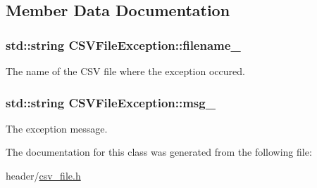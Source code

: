 \subsection{Member Data Documentation}
\hypertarget{classCSVFileException_adcd620025e1390e0fe83486da41b15de}{}
\subsubsection[{filename\+\_\+}]{\setlength{\rightskip}{0pt plus 5cm}std\+::string C\+S\+V\+File\+Exception\+::filename\+\_\+\hspace{0.3cm}{\ttfamily [private]}}\label{classCSVFileException_adcd620025e1390e0fe83486da41b15de}
The name of the C\+S\+V file where the exception occured. \hypertarget{classCSVFileException_ae1b104a3cff93917fd2c9ddac20b63f1}{}
\subsubsection[{msg\+\_\+}]{\setlength{\rightskip}{0pt plus 5cm}std\+::string C\+S\+V\+File\+Exception\+::msg\+\_\+\hspace{0.3cm}{\ttfamily [private]}}\label{classCSVFileException_ae1b104a3cff93917fd2c9ddac20b63f1}
The exception message. 

The documentation for this class was generated from the following file\+:\begin{DoxyCompactItemize}
\item 
header/\hyperlink{csv__file_8h}{csv\+\_\+file.\+h}\end{DoxyCompactItemize}
